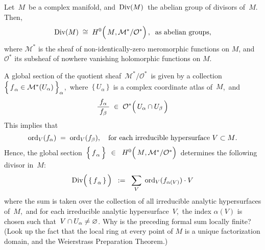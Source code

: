 \begin{proposition}
\mbox{}
\vskip 0.1cm
\noindent
Let \,$M$\, be a complex manifold, and \,$\textnormal{Div}(M)$\, the abelian group of divisors of \,$M$.\,
Then,
\begin{equation*}
\Div(M) \; \cong \; H^{0}\!\left(\,\overset{{\color{white}.}}{M} , \mathcal{M}^{*}/\mathcal{O}^{*}\right),
\;\;
\textnormal{as abelian groups},
\end{equation*}
where $\mathcal{M}^{*}$ is the sheaf of non-identically-zero meromorphic functions on $M$,
and $\mathcal{O}^{*}$ its subsheaf of nowhere vanishing holomorphic functions on $M$.
\end{proposition}
\proof
A global section of the quotient sheaf \,$\mathcal{M}^{*}/\mathcal{O}^{*}$\,
is given by a collection \,$\left\{\,\overset{{\color{white}.}}{f}_{\alpha} \in \mathcal{M}^{*}(U_{\alpha})\,\right\}_{\alpha}$,\,
where \,$\{\,U_{\alpha}\,\}$\, is a complex coordinate atlas of \,$M$,\, and
\begin{equation*}
\dfrac{{\color{white}.}f_{\alpha}{\color{white}.}}{f_{\beta}}
\;\in\;
	\mathcal{O}^{*}\!\left(\,U_{\alpha} \overset{{\color{white}.}}{\cap} U_{\beta}\,\right)
\end{equation*}
This implies that
\begin{equation*}
\textnormal{ord}_{V}(f_{\alpha}) \; = \; \textnormal{ord}_{V}(f_{\beta}),
\quad
\textnormal{for each irreducible hypersurface $V \subset M$}.
\end{equation*}
Hence, the global section
\,$\left\{\,\overset{{\color{white}.}}{f}_{\alpha}\,\right\}$ $\in$
\,$H^{0}\!\left(\,\overset{{\color{white}.}}{M} , \mathcal{M}^{*}/\mathcal{O}^{*}\right)$\,
determines the following divisor in \,$M$:\,
\begin{equation*}
\Div\!\left(\,\{\,\overset{{\color{white}.}}{f}_{\alpha}\,\}\,\right)
\;\; := \;\;
	\underset{V}{\sum} \;\, \ord_{V}(f_{\alpha(V)}) \cdot V
\end{equation*}
where the sum is taken over the collection of all irreducible analytic hypersurfaces
of \,$M$,\, and for each irreducible analytic hypersurface \,$V$,\,
the index $\alpha(V)$ is chosen such that \,$V \cap U_{\alpha} \neq \varnothing$.
{\color{red}Why is the preceding formal sum locally finite?
(Look up the fact that the local ring at every point of $M$ is a unique factorization domain, and the Weierstrass Preparation Theorem.)}

